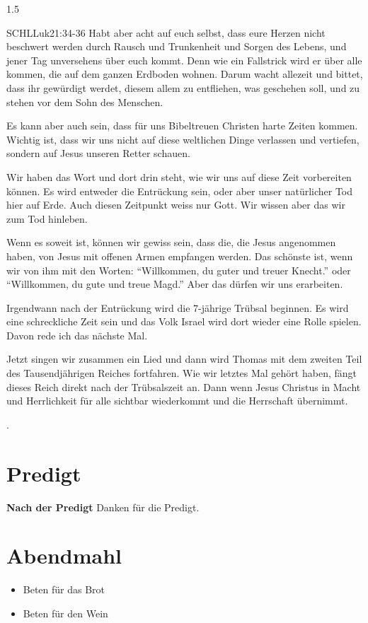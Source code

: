 \documentclass[14pt]{../../inc/mybib}
\begin{document}
\begin{spacing}{1.5}
\begin{block}
        \begin {bibelbox}{SCHL}{Luk}{21:34-36}
            Habt aber acht auf euch selbst, dass eure Herzen nicht beschwert werden durch Rausch und Trunkenheit und Sorgen des Lebens, und jener Tag unversehens über euch kommt. Denn wie ein Fallstrick wird er über alle kommen, die auf dem ganzen Erdboden wohnen. Darum wacht allezeit und bittet, dass ihr gewürdigt werdet, diesem allem zu entfliehen, was geschehen soll, und zu stehen vor dem Sohn des Menschen.
        \end{bibelbox}
        Es kann aber auch sein, dass für uns Bibeltreuen Christen harte Zeiten kommen. Wichtig ist, dass wir uns nicht auf diese weltlichen Dinge verlassen und vertiefen, sondern auf Jesus unseren Retter schauen.
        
        Wir haben das Wort und dort drin steht, wie wir uns auf diese Zeit vorbereiten können. Es wird entweder die Entrückung sein, oder aber unser natürlicher Tod hier auf Erde. Auch diesen Zeitpunkt weiss nur Gott. Wir wissen aber das wir zum Tod hinleben.

        Wenn es soweit ist, können wir gewiss sein, dass die, die Jesus angenommen haben, von Jesus mit offenen Armen empfangen werden. Das schönste ist, wenn wir von ihm mit den Worten: \enquote{Willkommen, du guter und treuer Knecht.} oder \enquote{Willkommen, du gute und treue Magd.} Aber das dürfen wir uns erarbeiten.
    \end{block}
    Irgendwann nach der Entrückung wird die 7-jährige Trübsal beginnen. Es wird eine schreckliche Zeit sein und das Volk Israel wird dort wieder eine Rolle spielen. Davon rede ich das nächste Mal. 
    
    Jetzt singen wir zusammen ein Lied und dann wird Thomas mit dem zweiten Teil des Tausendjährigen Reiches fortfahren. Wie wir letztes Mal gehört haben, fängt dieses Reich direkt nach der Trübsalszeit an. Dann wenn Jesus Christus in Macht und Herrlichkeit für alle sichtbar wiederkommt und die Herrschaft übernimmt.

    .
\end{spacing}
\section{Predigt}
\textbf{Nach der Predigt}\newline
Danken für die Predigt.
\section{Abendmahl}
\begin{itemize}
    \item [] Beten für das Brot
    \item [] Beten für den Wein
\end{itemize}
\end{document}
